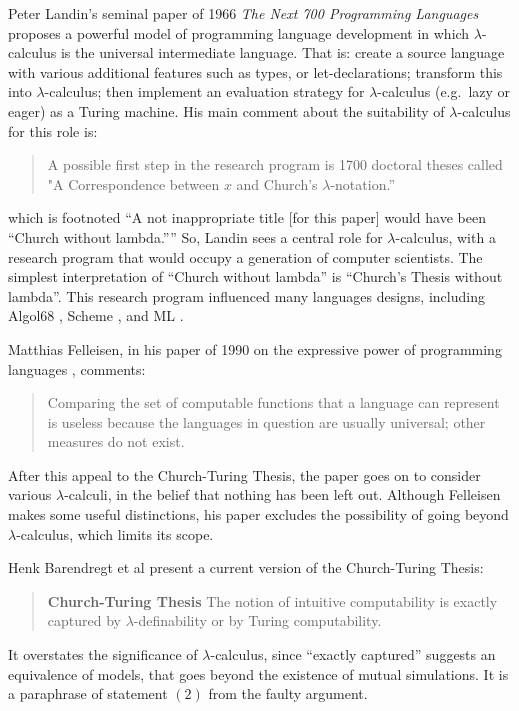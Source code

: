 \documentclass[a4paper]{article}
\begin{document}
Peter Landin's seminal paper of 1966 {\em The Next 700 Programming Languages}
\cite{Landin66} proposes a powerful model of programming language
development in which $\lambda$-calculus is the universal intermediate
language.  That is: create a source language with various additional
features such as types, or let-declarations; transform this into
$\lambda$-calculus; then implement an evaluation strategy for $\lambda$-calculus
(e.g.\ lazy or eager) as a Turing machine.  His main comment about the
suitability of  $\lambda$-calculus for this role is:
\begin{quote}
A possible first step in the research program is 1700 doctoral
theses called "A Correspondence between $x$ and Church's $\lambda$-notation.''
\end{quote}
which is footnoted ``A not inappropriate title [for this paper] would
have been ``Church without lambda.''''  So, Landin sees a central role
for $\lambda$-calculus, with a research program that would occupy a
generation of computer scientists.  The simplest
interpretation of ``Church without lambda'' is ``Church's Thesis
without lambda''.  This research program influenced many languages
designs, including Algol68 \cite{Rey81}, Scheme
\cite{sussman-steele75}, and ML
\cite{Tofte:89:TheDefinitionOfStandardML}.


Matthias Felleisen, in his paper of 1990 on the expressive power of
programming languages \cite{Felleisen90onthe}, comments:
\begin{quote}
Comparing the set of computable functions that a language can
represent is useless because the languages in question are usually
universal; other measures do not exist.
\end{quote}
After this appeal to the Church-Turing Thesis, the paper goes on to
consider various $\lambda$-calculi, in the belief that nothing has been
left out. Although Felleisen makes some useful distinctions, his paper
excludes the possibility of going beyond $\lambda$-calculus, which limits
its scope.

Henk Barendregt et al \cite{BarendregtMP13} present a current version
of the Church-Turing Thesis:
\begin{quote}
{\bf Church-Turing Thesis}
The notion of intuitive computability is exactly captured by
$\lambda$-definability or by Turing computability.
\end{quote}
It overstates the significance of $\lambda$-calculus, since ``exactly
captured'' suggests an equivalence of models, that goes beyond the
existence of mutual simulations.  It is a paraphrase of statement
$(2)$ from the faulty argument.
\end{document}
